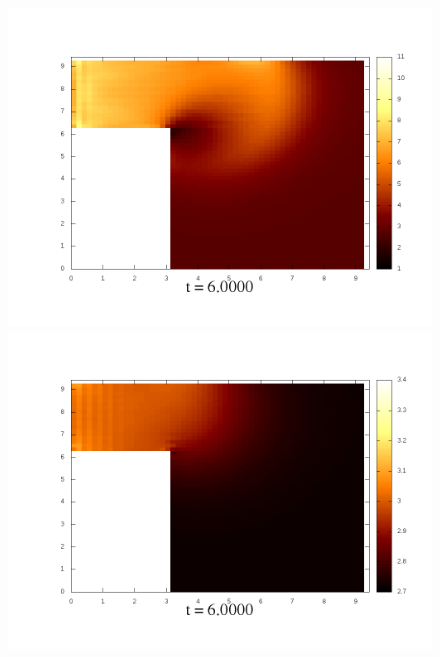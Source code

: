 \documentclass[a4paper, 12pt]{article}
\begin{document}
\begin{figure}[h]
		\begin{minipage}[h]{0.4\linewidth}
			\includegraphics[width=1\linewidth]{./img/01_1_1/G/30}
		\end{minipage}
		\hfill
		\begin{minipage}[h]{0.4\linewidth}
			\includegraphics[width=1\linewidth]{./img/01_1_01/G/30}
		\end{minipage}
\end{figure}
\end{document}
